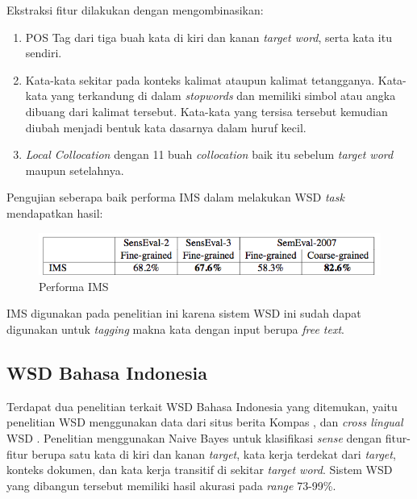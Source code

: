 Ekstraksi fitur dilakukan dengan mengombinasikan:

\begin{enumerate}
	\item POS Tag dari tiga buah kata di kiri dan kanan \textit{target word}, serta kata itu sendiri. 
	\item Kata-kata sekitar pada konteks kalimat ataupun kalimat tetangganya. Kata-kata yang terkandung di dalam \textit{stopwords} dan memiliki simbol atau angka dibuang dari kalimat tersebut. Kata-kata yang tersisa tersebut kemudian diubah menjadi bentuk kata dasarnya dalam huruf kecil.
	\item \textit{Local Collocation} dengan 11 buah \textit{collocation} baik itu sebelum \textit{target word} maupun setelahnya. 
\end{enumerate}

Pengujian seberapa baik performa IMS dalam melakukan  WSD \textit{task} mendapatkan hasil:

\begin{figure}
	\centering
	\includegraphics[width=1\linewidth]{adit_pics/Performa-IMS}
	\caption{Performa IMS \citep{zhong2010makes}}
	\label{fig:Performa-IMS}
\end{figure}

IMS digunakan pada penelitian ini karena sistem WSD ini sudah dapat digunakan untuk \textit{tagging} makna kata dengan input berupa \textit{free text}.

\subsection{WSD Bahasa Indonesia}

Terdapat dua penelitian terkait WSD Bahasa Indonesia yang ditemukan, yaitu penelitian WSD menggunakan data dari situs berita Kompas \citep{uliniansyah2006word}, dan \textit{cross lingual} WSD \citep{septiantri2013wsd}. Penelitian \citep{uliniansyah2006word} menggunakan Naive Bayes untuk klasifikasi \textit{sense} dengan fitur-fitur berupa satu kata di kiri dan kanan \textit{target}, kata kerja terdekat dari \textit{target}, konteks dokumen, dan kata kerja transitif di sekitar \textit{target word}. Sistem WSD yang dibangun tersebut memiliki hasil akurasi pada \textit{range} 73-99\%.

